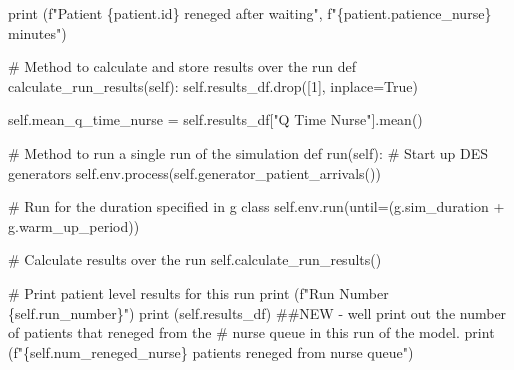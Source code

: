 \documentclass[
  letterpaper,
  DIV=11,
  numbers=noendperiod]{scrreprt}
\newenvironment{Shaded}{}{}
\newcommand{\BuiltInTok}[1]{\textcolor[rgb]{0.84,0.23,0.29}{#1}}
\newcommand{\CommentTok}[1]{\textcolor[rgb]{0.42,0.45,0.49}{#1}}
\newcommand{\DecValTok}[1]{\textcolor[rgb]{0.00,0.36,0.77}{#1}}
\newcommand{\KeywordTok}[1]{\textcolor[rgb]{0.84,0.23,0.29}{#1}}
\newcommand{\NormalTok}[1]{\textcolor[rgb]{0.14,0.16,0.18}{#1}}
\newcommand{\OperatorTok}[1]{\textcolor[rgb]{0.14,0.16,0.18}{#1}}
\newcommand{\SpecialCharTok}[1]{\textcolor[rgb]{0.00,0.36,0.77}{#1}}
\newcommand{\SpecialStringTok}[1]{\textcolor[rgb]{0.01,0.18,0.38}{#1}}
\newcommand{\StringTok}[1]{\textcolor[rgb]{0.01,0.18,0.38}{#1}}
\newcommand{\VariableTok}[1]{\textcolor[rgb]{0.89,0.38,0.04}{#1}}
\begin{document}
\begin{tcolorbox}
\begin{Shaded}
\begin{Highlighting}[]
                \BuiltInTok{print}\NormalTok{ (}\SpecialStringTok{f"Patient }\SpecialCharTok{\{}\NormalTok{patient}\SpecialCharTok{.}\BuiltInTok{id}\SpecialCharTok{\}}\SpecialStringTok{ reneged after waiting"}\NormalTok{,}
                       \SpecialStringTok{f"}\SpecialCharTok{\{}\NormalTok{patient}\SpecialCharTok{.}\NormalTok{patience\_nurse}\SpecialCharTok{\}}\SpecialStringTok{ minutes"}\NormalTok{)}

    \CommentTok{\# Method to calculate and store results over the run}
    \KeywordTok{def}\NormalTok{ calculate\_run\_results(}\VariableTok{self}\NormalTok{):}
        \VariableTok{self}\NormalTok{.results\_df.drop([}\DecValTok{1}\NormalTok{], inplace}\OperatorTok{=}\VariableTok{True}\NormalTok{)}

        \VariableTok{self}\NormalTok{.mean\_q\_time\_nurse }\OperatorTok{=} \VariableTok{self}\NormalTok{.results\_df[}\StringTok{"Q Time Nurse"}\NormalTok{].mean()}

    \CommentTok{\# Method to run a single run of the simulation}
    \KeywordTok{def}\NormalTok{ run(}\VariableTok{self}\NormalTok{):}
        \CommentTok{\# Start up DES generators}
        \VariableTok{self}\NormalTok{.env.process(}\VariableTok{self}\NormalTok{.generator\_patient\_arrivals())}

        \CommentTok{\# Run for the duration specified in g class}
        \VariableTok{self}\NormalTok{.env.run(until}\OperatorTok{=}\NormalTok{(g.sim\_duration }\OperatorTok{+}\NormalTok{ g.warm\_up\_period))}

        \CommentTok{\# Calculate results over the run}
        \VariableTok{self}\NormalTok{.calculate\_run\_results()}

        \CommentTok{\# Print patient level results for this run}
        \BuiltInTok{print}\NormalTok{ (}\SpecialStringTok{f"Run Number }\SpecialCharTok{\{}\VariableTok{self}\SpecialCharTok{.}\NormalTok{run\_number}\SpecialCharTok{\}}\SpecialStringTok{"}\NormalTok{)}
        \BuiltInTok{print}\NormalTok{ (}\VariableTok{self}\NormalTok{.results\_df)}
        \CommentTok{\#\#NEW {-} we\textquotesingle{}ll print out the number of patients that reneged from the}
        \CommentTok{\# nurse queue in this run of the model.}
        \BuiltInTok{print}\NormalTok{ (}\SpecialStringTok{f"}\SpecialCharTok{\{}\VariableTok{self}\SpecialCharTok{.}\NormalTok{num\_reneged\_nurse}\SpecialCharTok{\}}\SpecialStringTok{ patients reneged from nurse queue"}\NormalTok{)}


\end{Highlighting}
\end{Shaded}
\end{tcolorbox}
\end{document}
